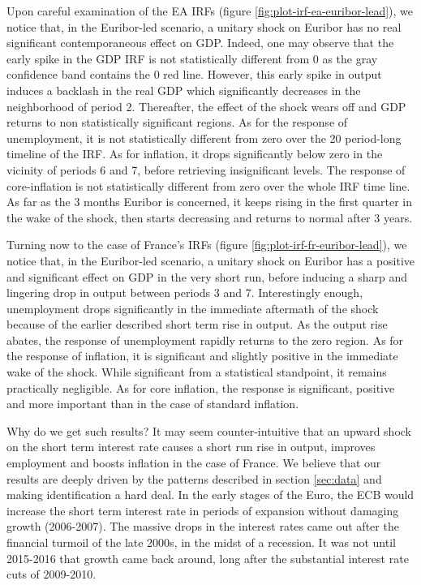 \documentclass[
  11pt,
]{article}
\begin{document}
Upon careful examination of the EA IRFs (figure \ref{fig:plot-irf-ea-euribor-lead}), we notice that, in the Euribor-led scenario, a unitary shock on Euribor has no real significant contemporaneous effect on GDP. Indeed, one may observe that the early spike in the GDP IRF is not statistically different from 0 as the gray confidence band contains the 0 red line.
However, this early spike in output induces a backlash in the real GDP which significantly decreases in the neighborhood of period 2. Thereafter, the effect of the shock wears off and GDP returns to non statistically significant regions. As for the response of unemployment, it is not statistically different from zero over the 20 period-long timeline of the IRF. As for inflation, it drops significantly below zero in the vicinity of periods 6 and 7, before retrieving insignificant levels. The response of core-inflation is not statistically different from zero over the whole IRF time line. As far as the 3 months Euribor is concerned, it keeps rising in the first quarter in the wake of the shock, then starts decreasing and returns to normal after 3 years.

Turning now to the case of France's IRFs (figure \ref{fig:plot-irf-fr-euribor-lead}), we notice that, in the Euribor-led scenario, a unitary shock on Euribor has a positive and significant effect on GDP in the very short run, before inducing a sharp and lingering drop in output between periods 3 and 7. Interestingly enough, unemployment drops significantly in the immediate aftermath of the shock because of the earlier described short term rise in output. As the output rise abates, the response of unemployment rapidly returns to the zero region. As for the response of inflation, it is significant and slightly positive in the immediate wake of the shock. While significant from a statistical standpoint, it remains practically negligible. As for core inflation, the response is significant, positive and more important than in the case of standard inflation.

Why do we get such results? It may seem counter-intuitive that an upward shock on the short term interest rate causes a short run rise in output, improves employment and boosts inflation in the case of France. We believe that our results are deeply driven by the patterns described in section \ref{sec:data} and making identification a hard deal. In the early stages of the Euro, the ECB would increase the short term interest rate in periods of expansion without damaging growth (2006-2007). The massive drops in the interest rates came out after the financial turmoil of the late 2000s, in the midst of a recession. It was not until 2015-2016 that growth came back around, long after the substantial interest rate cuts of 2009-2010.
\end{document}
